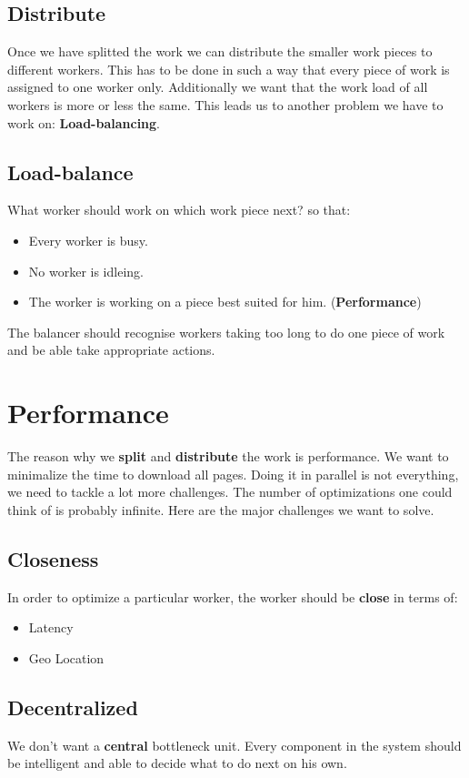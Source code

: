 \subsection{Distribute}
Once we have splitted the work we can distribute the smaller work pieces to different workers. This has to be done in such a way that every piece of work is assigned to one worker only. Additionally we want that the work load of all workers is more or less the same. This leads us to another problem we have to work on: \textbf{Load-balancing}.
\subsection{Load-balance}
What worker should work on which work piece next? so that:
\begin{itemize}
\item Every worker is busy.
\item No worker is idleing.
\item The worker is working on a piece best suited for him. (\textbf{Performance})
\end{itemize}
The balancer should recognise workers taking too long to do one piece of work and be able take appropriate actions.

\section{Performance}
The reason why we \textbf{split} and \textbf{distribute} the work is performance. We want to minimalize the time to download all pages. Doing it in parallel is not everything, we need to tackle a lot more challenges. The number of optimizations one could think of is probably infinite. Here are the major challenges we want to solve.
\subsection{Closeness}
In order to optimize a particular worker, the worker should be \textbf{close} in terms of:
\begin{itemize}
\item Latency
\item Geo Location
\end{itemize}
\subsection{Decentralized}
We don't want a \textbf{central} bottleneck unit. Every component in the system should be intelligent and able to decide what to do next on his own.
